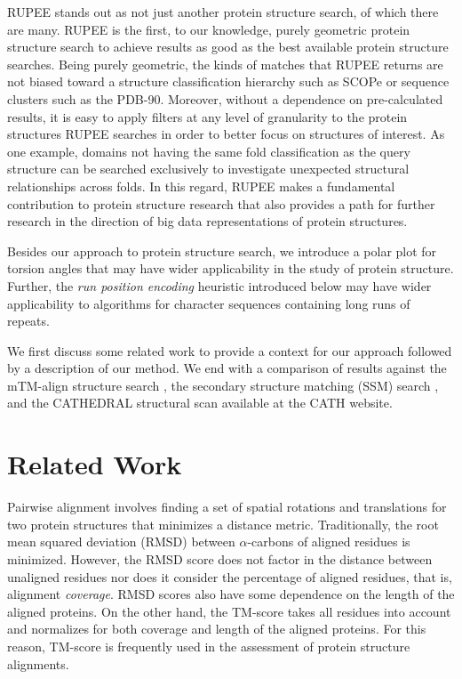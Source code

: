 \documentclass[10pt,letterpaper]{article}
\newcommand{\cas}{$\alpha$-carbons\xspace}
\begin{document}
RUPEE stands out as not just another protein structure search, of which there are many. 
RUPEE is the first, to our knowledge, purely geometric protein structure search to achieve results as good as the best available protein structure searches. 
Being purely geometric, the kinds of matches that RUPEE returns are not biased toward a structure classification hierarchy such as SCOPe or sequence clusters such as the PDB-90.
Moreover, without a dependence on pre-calculated results, it is easy to apply filters at any level of granularity to the protein structures RUPEE searches in order to better focus on structures of interest.
As one example, domains not having the same fold classification as the query structure can be searched exclusively to investigate unexpected structural relationships across folds. 
In this regard, RUPEE makes a fundamental contribution to protein structure research that also provides a path for further research in the direction of big data representations of protein structures. 

Besides our approach to protein structure search, we introduce a polar plot for torsion angles that may have wider applicability in the study of protein structure. 
Further, the \emph{run position encoding} heuristic introduced below may have wider applicability to algorithms for character sequences containing long runs of repeats. 

We first discuss some related work to provide a context for our approach followed by a description of our method. 
We end with a comparison of results against the mTM-align structure search \cite{Dong2018}, the secondary structure matching (SSM) search \cite{Krissinel2004}, and the CATHEDRAL structural scan \cite{Redfern2007} available at the CATH website.

\section*{Related Work}

Pairwise alignment involves finding a set of spatial rotations and translations for two protein structures that minimizes a distance metric. 
Traditionally, the root mean squared deviation (RMSD) between \cas of aligned residues is minimized.
However, the RMSD score does not factor in the distance between unaligned residues nor does it consider the percentage of aligned residues, that is, alignment \emph{coverage}. 
RMSD scores also have some dependence on the length of the aligned proteins. 
On the other hand, the TM-score \cite{Zhang2004} takes all residues into account and normalizes for both coverage and length of the aligned proteins. 
For this reason, TM-score is frequently used in the assessment of protein structure alignments. 
\end{document}
